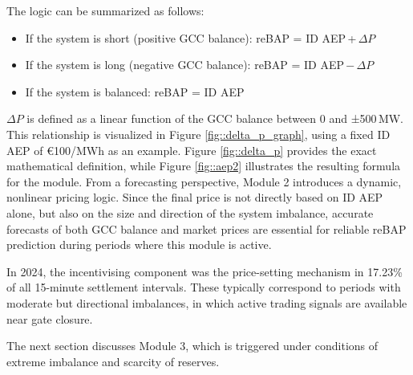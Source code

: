 \documentclass[class=scrbook, crop=false]{standalone}
\begin{document}
The logic can be summarized as follows:
\begin{itemize}
\item If the system is short (positive GCC balance):
 reBAP = ID AEP + $\Delta P$
\item If the system is long (negative GCC balance):
 reBAP = ID AEP − $\Delta P$
\item If the system is balanced:
 reBAP = ID AEP
\end{itemize}

$\Delta P$ is defined as a linear function of the GCC balance between 0 and ±500 MW. This relationship is visualized in Figure \ref{fig::delta_p_graph}, using a fixed ID AEP of €100/MWh as an example. Figure \ref{fig::delta_p} provides the exact mathematical definition, while Figure \ref{fig::aep2} illustrates the resulting formula for the module.
From a forecasting perspective, Module 2 introduces a dynamic, nonlinear pricing logic. Since the final price is not directly based on ID AEP alone, but also on the size and direction of the system imbalance, accurate forecasts of both GCC balance and market prices are essential for reliable reBAP prediction during periods where this module is active.

In 2024, the incentivising component was the price-setting mechanism in 17.23\% of all 15-minute settlement intervals. These typically correspond to periods with moderate but directional imbalances, in which active trading signals are available near gate closure.

The next section discusses Module 3, which is triggered under conditions of extreme imbalance and scarcity of reserves.

\end{document}
